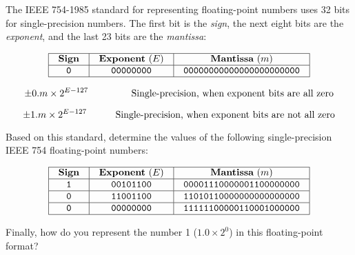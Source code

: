 

The IEEE 754-1985 standard for representing floating-point numbers uses 32 bits for single-precision numbers.  The first bit is the {\it sign}, the next eight bits are the {\it exponent}, and the last 23 bits are the {\it mantissa}:


$$\vbox{\offinterlineskip
\halign{\strut
\vrule \quad\hfil # \ \hfil & 
\vrule \quad\hfil # \ \hfil & 
\vrule \quad\hfil # \ \hfil \vrule \cr
\noalign{\hrule}
%
{\bf Sign} & {\bf Exponent} ($E$) & {\bf Mantissa} ($m$) \cr
%
\noalign{\hrule}
%
{\tt 0} & {\tt 00000000} & {\tt 00000000000000000000000} \cr
%
\noalign{\hrule}
} %
}$$ %

$$\pm 0.m \times 2^{E-127} \hskip 45pt \hbox{Single-precision, when exponent bits are all zero}$$

$$\pm 1.m \times 2^{E-127} \hskip 30pt \hbox{Single-precision, when exponent bits are not all zero}$$

Based on this standard, determine the values of the following single-precision IEEE 754 floating-point numbers:

\vskip 10pt


$$\vbox{\offinterlineskip
\halign{\strut
\vrule \quad\hfil # \ \hfil & 
\vrule \quad\hfil # \ \hfil & 
\vrule \quad\hfil # \ \hfil \vrule \cr
\noalign{\hrule}
%
{\bf Sign} & {\bf Exponent} ($E$) & {\bf Mantissa} ($m$) \cr
%
\noalign{\hrule}
%
{\tt 1} & {\tt 00101100} & {\tt 00001110000001100000000} \cr
%
\noalign{\hrule}
%
{\tt 0} & {\tt 11001100} & {\tt 11010110000000000000000} \cr
%
\noalign{\hrule}
%
{\tt 0} & {\tt 00000000} & {\tt 11111100000110001000000} \cr
%
\noalign{\hrule}
} %
}$$ %

Finally, how do you represent the number 1 ($1.0 \times 2^0$) in this floating-point format?






